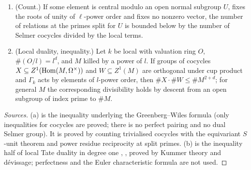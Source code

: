 \begin{theorem}\label{thm:B-greenberg-wiles}
\begin{enumerate}[label=\textup{(\alph*)}]
\item (Count.) If some element is central modulo an open normal subgroup $U$, fixes the roots of unity of $\ell$-power order and fixes no nonzero vector, the number of relations at the primes split for $U$ is bounded below by
the number of Selmer cocycles divided by the local terms.
\item (Local duality, inequality.) Let $k$ be local with valuation ring $O$, $\#(O/l)=l^d$, and $M$ killed by a power of $l$. If groups of cocycles $X\subseteq Z^1(\operatorname{Hom}(M,\Omega^\times))$ and $W\subseteq Z^1(M)$ are orthogonal under cup product and $\Gamma_k$ acts by
elements of $l$-power order, then $\#X\cdot\#W\le\#M^{2+d}$; for general $M$ the corresponding divisibility holds by descent from an open subgroup of index prime to $\#M$.
\end{enumerate}
\end{theorem}

\begin{proof}[Sources]
(a) is the inequality underlying the Greenberg--Wiles formula \cite{Greenberg1989,Wiles1990} (only inequalities for cocycles are proved; there is no perfect pairing and no dual Selmer group). It is proved by
counting trivialised cocycles with the equivariant $S$-unit theorem and power residue reciprocity at split primes. (b) is the inequality half of local Tate duality in degree one \cite[II \S5]{Serre1997},
\cite[I.2]{Milne2006}, proved by Kummer theory and d\'evissage; perfectness and the Euler characteristic formula are not used.
\end{proof}

